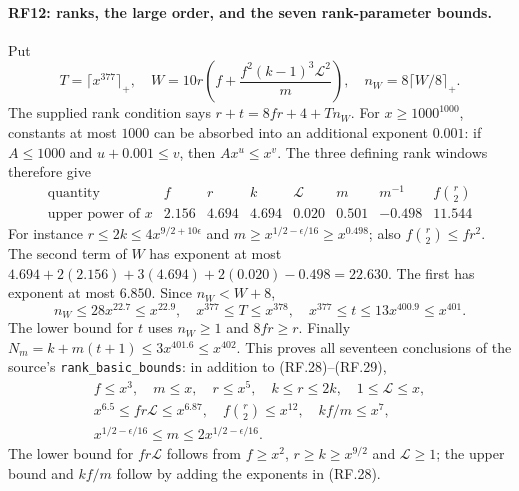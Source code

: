\documentclass[11pt,a4paper]{article}
\numberwithin{equation}{section}
\theoremstyle{remark}\newtheorem{remark}[theorem]{Remark}
\begin{document}
\paragraph{RF12: ranks, the large order, and the seven rank-parameter bounds.}
Put
\[
 T=\lceil x^{377}\rceil_+,
 \quad W=10r\left(f+\frac{f^2(k-1)^3\mathcal L^2}{m}\right),
 \quad n_W=8\lceil W/8\rceil_+ .                            \tag{RF.27}
\]
The supplied rank condition says $r+t=8fr+4+Tn_W$.
For $x\geq1000^{1000}$, constants at most $1000$ can be absorbed into
an additional exponent $0.001$: if $A\leq1000$ and $u+0.001\leq v$,
then $Ax^u\leq x^v$. The three defining rank windows therefore give
\[
\begin{array}{c|ccccccc}
\text{quantity}&f&r&k&\mathcal L&m&m^{-1}&f\binom r2\\ \hline
\text{upper power of }x&2.156&4.694&4.694&0.020&0.501&-0.498&11.544
\end{array}                                                   \tag{RF.28}
\]
For instance $r\leq2k\leq4x^{9/2+10\epsilon}$ and
$m\geq x^{1/2-\epsilon/16}\geq x^{0.498}$; also
$f\binom r2\leq fr^2$.
The second term of $W$ has exponent at most
$4.694+2(2.156)+3(4.694)+2(0.020)-0.498=22.630$.
The first has exponent at most $6.850$. Since $n_W<W+8$,
\[
 n_W\leq28x^{22.7}\leq x^{22.9},\quad
 x^{377}\leq T\leq x^{378},\quad
 x^{377}\leq t\leq13x^{400.9}\leq x^{401}.                  \tag{RF.29}
\]
The lower bound for $t$ uses $n_W\geq1$ and $8fr\geq r$.
Finally $N_m=k+m(t+1)\leq3x^{401.6}\leq x^{402}$.
This proves all seventeen conclusions of the source's
\texttt{rank\_\allowbreak basic\_\allowbreak bounds}: in addition to (RF.28)--(RF.29),
\[
\begin{gathered}
 f\leq x^3,\quad m\leq x,\quad r\leq x^5,\quad k\leq r\leq2k,
 \quad1\leq\mathcal L\leq x,\\
 x^{6.5}\leq fr\mathcal L\leq x^{6.87},\quad
 f\binom r2\leq x^{12},\quad kf/m\leq x^7,\\
 x^{1/2-\epsilon/16}\leq m\leq2x^{1/2-\epsilon/16}.
\end{gathered}                                                 \tag{RF.30}
\]
The lower bound for $fr\mathcal L$ follows from
$f\geq x^2$, $r\geq k\geq x^{9/2}$ and $\mathcal L\geq1$;
the upper bound and $kf/m$ follow by adding the exponents in (RF.28).
\end{document}
